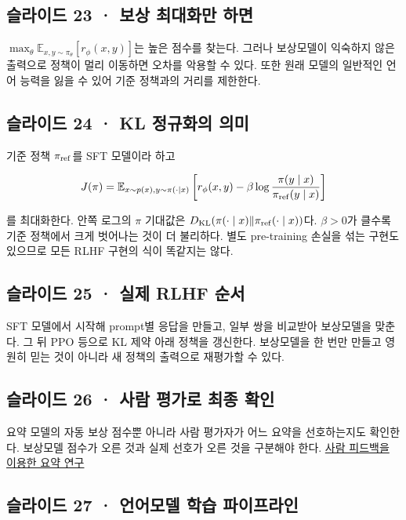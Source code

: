 \documentclass[11pt,a4paper]{article}
\begin{document}
\subsection{슬라이드 23 · 보상 최대화만 하면}

$\max_\theta\mathbb E_{x,y\sim\pi_\theta}[r_\phi(x,y)]$는 높은 점수를 찾는다. 그러나 보상모델이 익숙하지 않은 출력으로 정책이 멀리 이동하면 오차를 악용할 수 있다. 또한 원래 모델의 일반적인 언어 능력을 잃을 수 있어 기준 정책과의 거리를 제한한다.\par

\subsection{슬라이드 24 · KL 정규화의 의미}

기준 정책 $\pi_{\rm ref}$를 SFT 모델이라 하고\par

\[
J(\pi)=\mathbb E_{x\sim p(x),y\sim\pi(\cdot\mid x)}
\left[r_\phi(x,y)-\beta\log\frac{\pi(y\mid x)}{\pi_{\rm ref}(y\mid x)}\right]
\]

를 최대화한다. 안쪽 로그의 $\pi$ 기대값은 $D_{\rm KL}(\pi(\cdot\mid x)\|\pi_{\rm ref}(\cdot\mid x))$다. $\beta>0$가 클수록 기준 정책에서 크게 벗어나는 것이 더 불리하다. 별도 pre-training 손실을 섞는 구현도 있으므로 모든 RLHF 구현의 식이 똑같지는 않다.\par

\subsection{슬라이드 25 · 실제 RLHF 순서}

SFT 모델에서 시작해 prompt별 응답을 만들고, 일부 쌍을 비교받아 보상모델을 맞춘다. 그 뒤 PPO 등으로 KL 제약 아래 정책을 갱신한다. 보상모델을 한 번만 만들고 영원히 믿는 것이 아니라 새 정책의 출력으로 재평가할 수 있다.\par

\subsection{슬라이드 26 · 사람 평가로 최종 확인}

요약 모델의 자동 보상 점수뿐 아니라 사람 평가자가 어느 요약을 선호하는지도 확인한다. 보상모델 점수가 오른 것과 실제 선호가 오른 것을 구분해야 한다. \href{https://arxiv.org/abs/2009.01325}{사람 피드백을 이용한 요약 연구}\par

\subsection{슬라이드 27 · 언어모델 학습 파이프라인}
\end{document}
